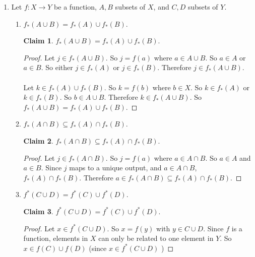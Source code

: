 \documentclass[11pt]{letter}
\theoremstyle{definition}
\newtheorem{claim}{Claim}
\begin{document}
\begin{description}
\begin{enumerate}
                                
			\item Let $f:X\rightarrow Y$ be a function, $A,B$ subsets of $X$, and $C,D$ subsets of $Y$.
				\begin{enumerate}
				\item  $f_*(A\cup B)=f_*(A)\cup f_*(B)$.
                                  \begin{claim}
                                    $f_*(A\cup B)=f_*(A)\cup f_*(B)$.
                                  \end{claim}
                                  \begin{proof}
                                    Let $j\in f_*(A\cup B)$. So $j=f(a)$ where $a\in A\cup B$. So $a\in A$ or $a\in B$. So either $j\in f_*(A)$ or $j\in f_*(B)$. Therefore $j\in f_*(A\cup B)$.\\ \\
                                    Let $k\in f_*(A)\cup f_*(B)$. So $k=f(b)$ where $b\in X$. So $k\in f_*(A)$ or $k\in f_*(B)$. So $b\in A\cup B$. Therefore $k\in f_*(A\cup B)$. So $f_*(A\cup B)=f_*(A)\cup f_*(B)$.
                                  \end{proof}
                                  
                                  
				\item $f_*(A\cap B)\subseteq f_*(A)\cap f_*(B)$.
                                  \begin{claim}
                                    $f_*(A\cap B)\subseteq f_*(A)\cap f_*(B)$.
                                  \end{claim}
                                  \begin{proof}
                                    Let $j\in f_*(A\cap B)$. So $j=f(a)$ where $a\in A\cap B$. So $a\in A$ and $a\in B$. Since $j$ maps to a unique output, and $a\in A\cap B$, $f_*(A)\cap f_*(B)$. Therefore $a\in f_*(A\cap B)\subseteq f_*(A)\cap f_*(B)$.
                                    \end{proof}
				\item $f^*(C\cup D)=f^*(C)\cup f^*(D)$.
                                  \begin{claim}
                                     $f^*(C\cup D)=f^*(C)\cup f^*(D)$.
                                  \end{claim}
                                  \begin{proof}
                                    Let $x\in f^*(C\cup D)$. So $x=f(y)$ with $y\in C\cup D$. Since $f$ is a function, elements in $X$ can only be related to one element in $Y$. So $x\in f(C)\cup f(D)$ (since $x\in f^*(C\cup D)$ )
                                  \end{proof}
                                  

\end{enumerate}
\end{enumerate}
\end{description}
\end{document}
